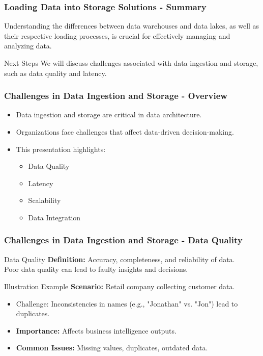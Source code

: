 \documentclass[aspectratio=169]{beamer}
\begin{document}
\begin{frame}[fragile]
    \frametitle{Loading Data into Storage Solutions - Summary}
    Understanding the differences between data warehouses and data lakes, as well as their respective loading processes, is crucial for effectively managing and analyzing data.
    \begin{block}{Next Steps}
        We will discuss challenges associated with data ingestion and storage, such as data quality and latency.
    \end{block}
\end{frame}

\begin{frame}[fragile]
    \frametitle{Challenges in Data Ingestion and Storage - Overview}
    \begin{itemize}
        \item Data ingestion and storage are critical in data architecture.
        \item Organizations face challenges that affect data-driven decision-making.
        \item This presentation highlights:
        \begin{itemize}
            \item Data Quality
            \item Latency
            \item Scalability
            \item Data Integration
        \end{itemize}
    \end{itemize}
\end{frame}

\begin{frame}[fragile]
    \frametitle{Challenges in Data Ingestion and Storage - Data Quality}
    \begin{block}{Data Quality}
        \textbf{Definition:} Accuracy, completeness, and reliability of data.\\
        Poor data quality can lead to faulty insights and decisions.
    \end{block}
    \begin{exampleblock}{Illustration Example}
        \textbf{Scenario:} Retail company collecting customer data.
        \begin{itemize}
            \item Challenge: Inconsistencies in names (e.g., "Jonathan" vs. "Jon") lead to duplicates.
        \end{itemize}
    \end{exampleblock}
    \begin{itemize}
        \item \textbf{Importance:} Affects business intelligence outputs.
        \item \textbf{Common Issues:} Missing values, duplicates, outdated data.
    \end{itemize}
\end{frame}
\end{document}
